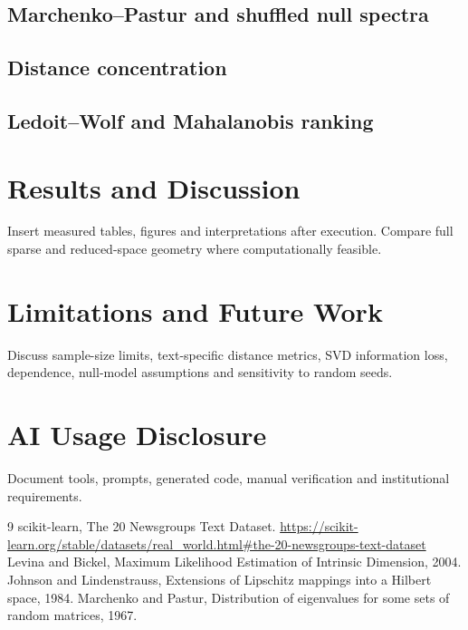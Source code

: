 \documentclass[11pt,a4paper]{article}
\begin{document}
\subsection{Marchenko--Pastur and shuffled null spectra}
\subsection{Distance concentration}
\subsection{Ledoit--Wolf and Mahalanobis ranking}
\section{Results and Discussion}
Insert measured tables, figures and interpretations after execution. Compare full sparse and reduced-space geometry where computationally feasible.
\section{Limitations and Future Work}
Discuss sample-size limits, text-specific distance metrics, SVD information loss, dependence, null-model assumptions and sensitivity to random seeds.
\section*{AI Usage Disclosure}
Document tools, prompts, generated code, manual verification and institutional requirements.
\begin{thebibliography}{9}
 scikit-learn, The 20 Newsgroups Text Dataset. \url{https://scikit-learn.org/stable/datasets/real_world.html#the-20-newsgroups-text-dataset}
 Levina and Bickel, Maximum Likelihood Estimation of Intrinsic Dimension, 2004.
 Johnson and Lindenstrauss, Extensions of Lipschitz mappings into a Hilbert space, 1984.
 Marchenko and Pastur, Distribution of eigenvalues for some sets of random matrices, 1967.
\end{thebibliography}
\end{document}
